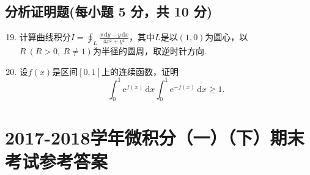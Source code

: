 \documentclass[../main.tex]{subfiles}
\begin{document}
\section{分析证明题(每小题 5 分，共 10 分)}
\begin{enumerate}
    \setcounter{enumi}{18}
    \item 计算曲线积分$I=\oint_L\frac{x\,\mathrm{d}y-y\,\mathrm{d}x}{4x^2+y^2}$，其中$L$是以$(1,0)$为圆心，以$R\ (R>0,\ R\neq1)$为半径的圆周，取逆时针方向.
          \vspace{9em}

    \item 设$f(x)$是区间$[0,1]$上的连续函数，证明
          \[
              \int_0^1\mathrm{e}^{f(x)}\,\mathrm{d}x\int_0^1\mathrm{e}^{-f(x)}\,\mathrm{d}x\geq1.
          \]
          \vspace{9em}
\end{enumerate}

\chapter{2017-2018学年微积分（一）（下）期末考试参考答案}
\end{document}
